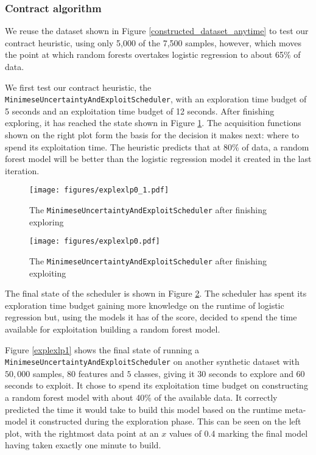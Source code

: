 \documentclass[a4paper,12pt,twoside,openright]{report}
\begin{document}
\subsubsection{Contract algorithm}

We reuse the dataset shown in Figure \ref{constructed_dataset_anytime} to test our contract heuristic, using only 5,000 of the 7,500 samples, however, which moves the point at which random forests overtakes logistic regression to about 65\% of data.

We first test our contract heuristic, the \texttt{Minimese\-Uncertainty\-And\-Exploit\-Scheduler}, with an exploration time budget of 5 seconds and an exploitation time budget of 12 seconds. After finishing exploring, it has reached the state shown in Figure \ref{explexlp0_1}. The acquisition functions shown on the right plot form the basis for the decision it makes next: where to spend its exploitation time. The heuristic predicts that at 80\% of data, a random forest model will be better than the logistic regression model it created in the last iteration.

\begin{figure}[p]
\centering
  \texttt{[image: figures/explexlp0\_1.pdf]}
  \caption{The \texttt{MinimeseUncertaintyAndExploitScheduler} after finishing exploring}
  \label{explexlp0_1}
\end{figure}

\begin{figure}[p]
\centering
  \texttt{[image: figures/explexlp0.pdf]}
  \caption{The \texttt{MinimeseUncertaintyAndExploitScheduler} after finishing exploiting}
  \label{explexlp0}
\end{figure}

The final state of the scheduler is shown in Figure \ref{explexlp0}. The scheduler has spent its exploration time budget gaining more knowledge on the runtime of logistic regression but, using the models it has of the score, decided to spend the time available for exploitation building a random forest model.





Figure \ref{explexlp1} shows the final state of running a \texttt{Minimese\-Uncertainty\-And\-Exploit\-Scheduler} on another synthetic dataset with $50,000$ samples, $80$ features and $5$ classes, giving it 30 seconds to explore and 60 seconds to exploit. It chose to spend its exploitation time budget on constructing a random forest model with about 40\% of the available data. It correctly predicted the time it would take to build this model based on the runtime meta-model it constructed during the exploration phase. This can be seen on the left plot, with the rightmost data point at an $x$ values of 0.4 marking the final model having taken exactly one minute to build.
\end{document}
